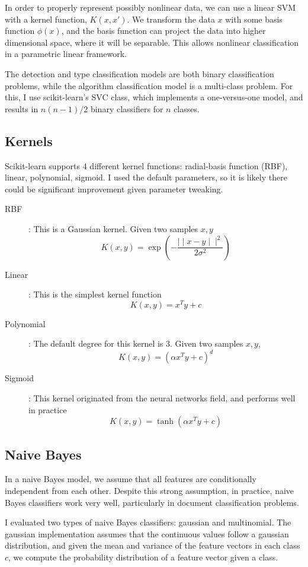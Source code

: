 In order to properly represent possibly nonlinear data, we can use a linear SVM with a kernel function, $K(x, x')$.  We transform the data $x$ with some basis function $\phi(x)$, and the basis function can project the data into higher dimensional space, where it will be separable.  This allows nonlinear classification in a parametric linear framework.

The detection and type classification models are both binary classification problems, while the algorithm classification model is a multi-class problem.  For this, I use scikit-learn's SVC class, which implements a one-versus-one model\cite{knerr}, and results in $n (n-1)/2$ binary classifiers for $n$ classes.

\subsection{Kernels}
Scikit-learn supports 4 different kernel functions: radial-basis function (RBF), linear, polynomial, sigmoid.  I used the default parameters, so it is likely there could be significant improvement given parameter tweaking.
 
\begin{description}
	\item[RBF]: This is a Gaussian kernel.  Given two samples $x, y$
		$$ K(x, y) = \exp \left( -\frac{\mid \mid x-y \mid \mid^2}{2\sigma^2} \right) $$
	\item[Linear]: This is the simplest kernel function
		$$ K(x, y) = x^Ty + c $$
	\item[Polynomial]: The default degree for this kernel is 3.  Given two samples $x, y$,
		$$ K(x, y) = (\alpha x^Ty +c)^d $$ %
	\item[Sigmoid]: This kernel originated from the neural networks field, and performs well in practice
		$$ K(x, y)= \tanh(\alpha x^T y +c) $$
\end{description}

\subsection{Naive Bayes}
In a naive Bayes model, we assume that all features are conditionally independent from each other.  Despite this strong assumption, in practice, naive Bayes classifiers work very well, particularly in document classification problems.

I evaluated two types of naive Bayes classifiers: gaussian and multinomial.  The gaussian implementation assumes that the continuous values follow a gaussian distribution, and given the mean and variance of the feature vectors in each class $c$, we compute the probability distribution of a feature vector given a class.

